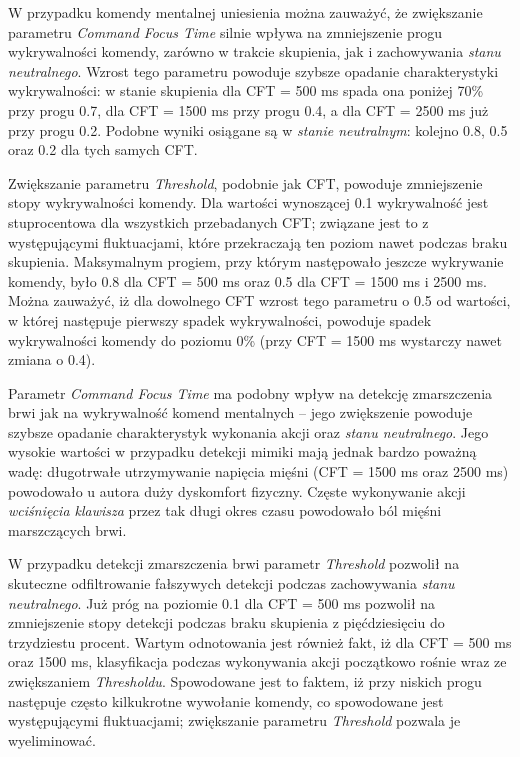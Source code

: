 \documentclass[skorowidz,skroty]{dyplomWEZUT}
\begin{document}
W przypadku komendy mentalnej uniesienia można zauważyć, że zwiększanie parametru \textit{Command Focus Time} silnie wpływa na zmniejszenie progu wykrywalności komendy, zarówno w trakcie skupienia, jak i zachowywania \textit{stanu neutralnego}. Wzrost tego parametru powoduje szybsze opadanie charakterystyki wykrywalności: w stanie skupienia dla CFT = 500 ms spada ona poniżej 70\% przy progu 0.7, dla CFT = 1500 ms przy progu 0.4, a dla CFT = 2500 ms już przy progu 0.2. Podobne wyniki osiągane są w \textit{stanie neutralnym}: kolejno 0.8, 0.5 oraz 0.2 dla tych samych CFT.

Zwiększanie parametru \textit{Threshold}, podobnie jak CFT, powoduje zmniejszenie stopy wykrywalności komendy. Dla wartości wynoszącej 0.1 wykrywalność jest stuprocentowa dla wszystkich przebadanych CFT; związane jest to z występującymi fluktuacjami, które przekraczają ten poziom nawet podczas braku skupienia. Maksymalnym progiem, przy którym następowało jeszcze wykrywanie komendy, było 0.8 dla CFT = 500 ms oraz 0.5 dla CFT = 1500 ms i 2500 ms. Można zauważyć, iż dla dowolnego CFT wzrost tego parametru o 0.5 od wartości, w której następuje pierwszy spadek wykrywalności, powoduje spadek wykrywalności komendy do poziomu 0\% (przy CFT = 1500 ms wystarczy nawet zmiana o 0.4).

Parametr \textit{Command Focus Time} ma podobny wpływ na detekcję zmarszczenia brwi jak na wykrywalność komend mentalnych -- jego zwiększenie powoduje szybsze opadanie charakterystyk wykonania akcji oraz \textit{stanu neutralnego}. Jego wysokie wartości w przypadku detekcji mimiki mają jednak bardzo poważną wadę: długotrwałe utrzymywanie napięcia mięśni (CFT = 1500 ms oraz 2500 ms) powodowało u autora duży dyskomfort fizyczny. Częste wykonywanie akcji \textit{wciśnięcia klawisza} przez tak długi okres czasu powodowało ból mięśni marszczących brwi.

W przypadku detekcji zmarszczenia brwi parametr \textit{Threshold} pozwolił na skuteczne odfiltrowanie fałszywych detekcji podczas zachowywania \textit{stanu neutralnego}. Już próg na poziomie 0.1 dla CFT = 500 ms pozwolił na zmniejszenie stopy detekcji podczas braku skupienia z pięćdziesięciu do trzydziestu procent. Wartym odnotowania jest również fakt, iż dla CFT = 500 ms oraz 1500 ms, klasyfikacja podczas wykonywania akcji początkowo rośnie wraz ze zwiększaniem \textit{Thresholdu}. Spowodowane jest to faktem, iż przy niskich progu następuje często kilkukrotne wywołanie komendy, co spowodowane jest występującymi fluktuacjami; zwiększanie parametru \textit{Threshold} pozwala je wyeliminować.
\end{document}
